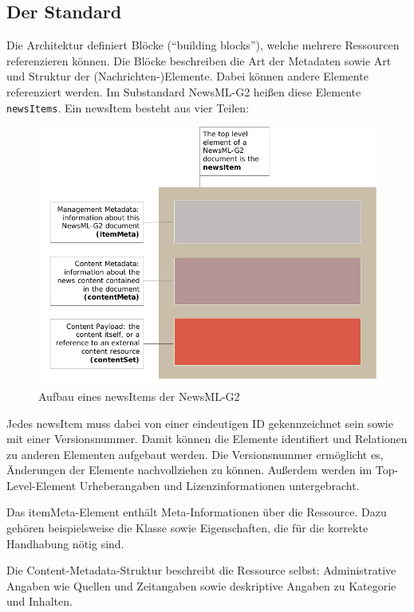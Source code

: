 	\subsection{Der Standard}
	Die Architektur definiert Blöcke (\enquote{building blocks}), welche mehrere Ressourcen referenzieren können. Die Blöcke beschreiben die Art der Metadaten sowie Art und Struktur der (Nachrichten-)Elemente. Dabei können andere Elemente referenziert werden. Im Substandard NewsML-G2 heißen diese Elemente \texttt{newsItems}. Ein newsItem besteht aus vier Teilen:
	
	\begin{figure}[htbp]
		\includegraphics[width=\columnwidth]{images/iptc_news_item.pdf}
		\caption{Aufbau eines newsItems der NewsML-G2}
		\label{myfigure}
	\end{figure}

	Jedes newsItem muss dabei von einer eindeutigen ID gekennzeichnet sein sowie mit einer Versionsnummer. Damit können die Elemente identifiert und Relationen zu anderen Elementen aufgebaut werden. Die Versionsnummer ermöglicht es, Änderungen der Elemente nachvollziehen zu können. Außerdem werden im Top-Level-Element Urheberangaben und Lizenzinformationen untergebracht.
	
	Das itemMeta-Element enthält Meta-Informationen über die Ressource. Dazu gehören beispielsweise die Klasse sowie Eigenschaften, die für die korrekte Handhabung nötig sind.
	
	Die Content-Metadata-Struktur beschreibt die Ressource selbst: Administrative Angaben wie Quellen und Zeitangaben sowie deskriptive Angaben zu Kategorie und Inhalten.
	
